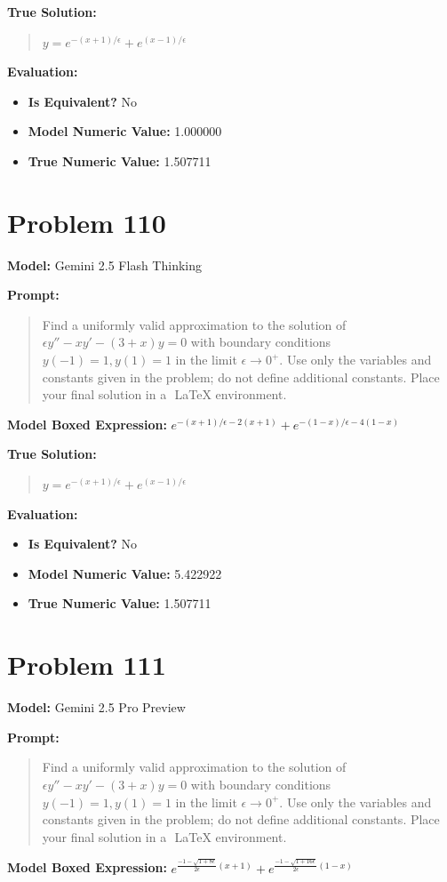 \documentclass{article}
\begin{document}
{\textbf{True Solution:}
\begin{quote}
$y = e^{-(x+1)/\epsilon} + e^{(x-1)/\epsilon}$
\end{quote}

\textbf{Evaluation:}
\begin{itemize}
\item \textbf{Is Equivalent?} No
\item \textbf{Model Numeric Value:} 1.000000
\item \textbf{True Numeric Value:} 1.507711
\end{itemize}
\vspace{1cm}
\section*{Problem 110}
\textbf{Model:} Gemini 2.5 Flash Thinking

\textbf{Prompt:}
\begin{quote}
Find a uniformly valid approximation to the solution of $\epsilon y'' - x y' - (3 + x)y = 0$ with boundary conditions $y(-1) = 1, y(1) = 1$ in the limit $\epsilon \to 0^+$. Use only the variables and constants given in the problem; do not define additional constants. Place your final solution in a $\boxed{}$ LaTeX environment.
\end{quote}
\textbf{Model Boxed Expression:} $e^{-(x+1)/\epsilon - 2(x+1)} + e^{-(1-x)/\epsilon - 4(1-x)}$

\textbf{True Solution:}
\begin{quote}
$y = e^{-(x+1)/\epsilon} + e^{(x-1)/\epsilon}$
\end{quote}

\textbf{Evaluation:}
\begin{itemize}
\item \textbf{Is Equivalent?} No
\item \textbf{Model Numeric Value:} 5.422922
\item \textbf{True Numeric Value:} 1.507711
\end{itemize}
\vspace{1cm}
\section*{Problem 111}
\textbf{Model:} Gemini 2.5 Pro Preview

\textbf{Prompt:}
\begin{quote}
Find a uniformly valid approximation to the solution of $\epsilon y'' - x y' - (3 + x)y = 0$ with boundary conditions $y(-1) = 1, y(1) = 1$ in the limit $\epsilon \to 0^+$. Use only the variables and constants given in the problem; do not define additional constants. Place your final solution in a $\boxed{}$ LaTeX environment.
\end{quote}
\textbf{Model Boxed Expression:} $e^{\frac{-1-\sqrt{1+8\epsilon}}{2\epsilon}(x+1)} + e^{\frac{-1-\sqrt{1+16\epsilon}}{2\epsilon}(1-x)}$

}
\end{document}

